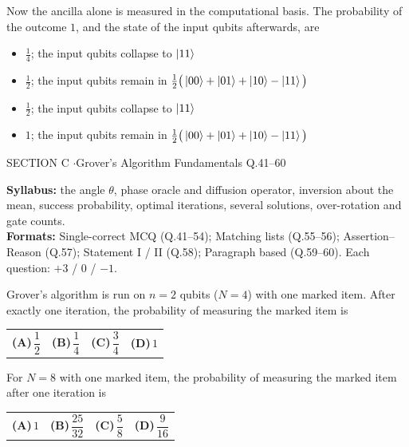 \documentclass[11pt,a4paper]{article}
\newcommand{\optlabel}[1]{\textbf{(#1)}}
\newenvironment{qitem}[1]{\begin{list}{}{\setlength{\leftmargin}{3.3em}\setlength{\labelwidth}{3.1em}%
  \setlength{\labelsep}{0.2em}\setlength{\topsep}{3pt}\setlength{\parsep}{3pt}}\item[\textbf{Q.#1}\hfill]}{\end{list}}
\newcommand{\qsep}{\par\vspace{2pt}{\color{black!15}\hrule}\vspace{4pt}}
\begin{document}
\begin{qitem}{40}
Now the ancilla alone is measured in the computational basis. The probability of the outcome $1$, and the state of the input qubits afterwards, are
\begin{itemize}[leftmargin=2.6em, labelsep=0.4em, itemsep=2pt, topsep=3pt]
\item[\optlabel{A}] $\frac14$; the input qubits collapse to $\ket{11}$
\item[\optlabel{B}] $\frac12$; the input qubits remain in $\frac12\big(\ket{00} + \ket{01} + \ket{10} - \ket{11}\big)$
\item[\optlabel{C}] $\frac12$; the input qubits collapse to $\ket{11}$
\item[\optlabel{D}] $1$; the input qubits remain in $\frac12\big(\ket{00} + \ket{01} + \ket{10} - \ket{11}\big)$
\end{itemize}
\end{qitem}
\qsep

\newpage

\begin{sectionbanner}SECTION C \enspace$\cdot$\enspace Grover's Algorithm Fundamentals \hfill Q.41--60\end{sectionbanner}

{\small \textbf{Syllabus:} the angle $\theta$, phase oracle and diffusion operator, inversion about the mean, success probability, optimal iterations, several solutions, over-rotation and gate counts.\\ \textbf{Formats:} Single-correct MCQ (Q.41--54); Matching lists (Q.55--56); Assertion--Reason (Q.57); Statement I / II (Q.58); Paragraph based (Q.59--60). Each question: $+3$ / $0$ / $-1$.}
\par\medskip

\begin{qitem}{41}
Grover's algorithm is run on $n = 2$ qubits ($N = 4$) with one marked item. After exactly one iteration, the probability of measuring the marked item is
\par\smallskip\noindent\begin{tabularx}{\linewidth}{@{}*{4}{L}@{}}
\optlabel{A}\,$\dfrac12$ & \optlabel{B}\,$\dfrac14$ & \optlabel{C}\,$\dfrac34$ & \optlabel{D}\,$1$
\end{tabularx}
\end{qitem}
\qsep

\begin{qitem}{42}
For $N = 8$ with one marked item, the probability of measuring the marked item after one iteration is
\par\smallskip\noindent\begin{tabularx}{\linewidth}{@{}*{4}{L}@{}}
\optlabel{A}\,$1$ & \optlabel{B}\,$\dfrac{25}{32}$ & \optlabel{C}\,$\dfrac58$ & \optlabel{D}\,$\dfrac{9}{16}$
\end{tabularx}
\end{qitem}
\qsep
\end{document}
